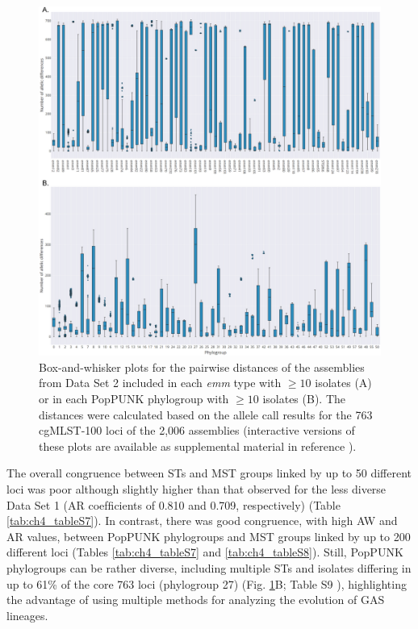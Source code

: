\newpage
\begin{figure}[h!]
    \centering
    \includegraphics[width=\textwidth]{figures/chapter 4/Figure3.pdf}
    \caption{Box-and-whisker plots for the pairwise distances of the assemblies from Data Set 2 \cite{davies_atlas_2019, friaes_supplemental_2023} included in each \textit{emm} type with $\geq10$ isolates (A) or in each PopPUNK phylogroup with $\geq10$ isolates (B). The distances were calculated based on the allele call results for the 763 cgMLST-100 loci of the 2,006 assemblies (interactive versions of these plots are available as supplemental material in reference \cite{friaes_supplemental_2023}).}
    \label{fig:chap4_figure3}
\end{figure}

The overall congruence between \ac{ST}s and \ac{MST} groups linked by up to 50 different loci was poor although slightly higher than that observed for the less diverse Data Set 1 (\ac{AR} coefﬁcients of 0.810 and 0.709, respectively) (Table \ref{tab:ch4_tableS7}). In contrast, there was good congruence, with high \ac{AW} and \ac{AR} values, between \ac{PopPUNK} phylogroups and \ac{MST} groups linked by up to 200 different loci (Tables \ref{tab:ch4_tableS7} and \ref{tab:ch4_tableS8}). Still, \ac{PopPUNK} phylogroups can be rather diverse, including multiple \ac{ST}s and isolates differing in up to 61\% of the core 763 loci (phylogroup 27) (Fig. \ref{fig:chap4_figure3}B; Table S9 \cite{friaes_supplemental_2023}), highlighting the advantage of using multiple methods for analyzing the evolution of \ac{GAS} lineages.

